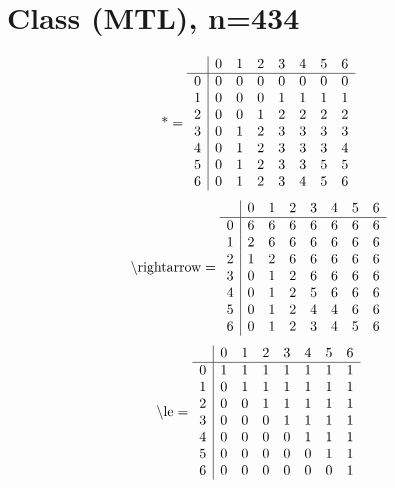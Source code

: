 \documentclass[11pt]{article}
\begin{document}
\section{Class (MTL), n=434}
\[\text{*} = 
\begin{array}{r | r r r r r r r}
 & 0 & 1 & 2 & 3 & 4 & 5 & 6 \\ \hline
0 & 0 & 0 & 0 & 0 & 0 & 0 & 0 \\
1 & 0 & 0 & 0 & 1 & 1 & 1 & 1 \\
2 & 0 & 0 & 1 & 2 & 2 & 2 & 2 \\
3 & 0 & 1 & 2 & 3 & 3 & 3 & 3 \\
4 & 0 & 1 & 2 & 3 & 3 & 3 & 4 \\
5 & 0 & 1 & 2 & 3 & 3 & 5 & 5 \\
6 & 0 & 1 & 2 & 3 & 4 & 5 & 6 \\
\end{array}
\]
\[\text{\textbackslash rightarrow} = 
\begin{array}{r | r r r r r r r}
 & 0 & 1 & 2 & 3 & 4 & 5 & 6 \\ \hline
0 & 6 & 6 & 6 & 6 & 6 & 6 & 6 \\
1 & 2 & 6 & 6 & 6 & 6 & 6 & 6 \\
2 & 1 & 2 & 6 & 6 & 6 & 6 & 6 \\
3 & 0 & 1 & 2 & 6 & 6 & 6 & 6 \\
4 & 0 & 1 & 2 & 5 & 6 & 6 & 6 \\
5 & 0 & 1 & 2 & 4 & 4 & 6 & 6 \\
6 & 0 & 1 & 2 & 3 & 4 & 5 & 6 \\
\end{array}
\]
\[\text{\textbackslash le} = 
\begin{array}{r | r r r r r r r}
 & 0 & 1 & 2 & 3 & 4 & 5 & 6 \\ \hline
0 & 1 & 1 & 1 & 1 & 1 & 1 & 1 \\
1 & 0 & 1 & 1 & 1 & 1 & 1 & 1 \\
2 & 0 & 0 & 1 & 1 & 1 & 1 & 1 \\
3 & 0 & 0 & 0 & 1 & 1 & 1 & 1 \\
4 & 0 & 0 & 0 & 0 & 1 & 1 & 1 \\
5 & 0 & 0 & 0 & 0 & 0 & 1 & 1 \\
6 & 0 & 0 & 0 & 0 & 0 & 0 & 1 \\
\end{array}
\]
\end{document}
